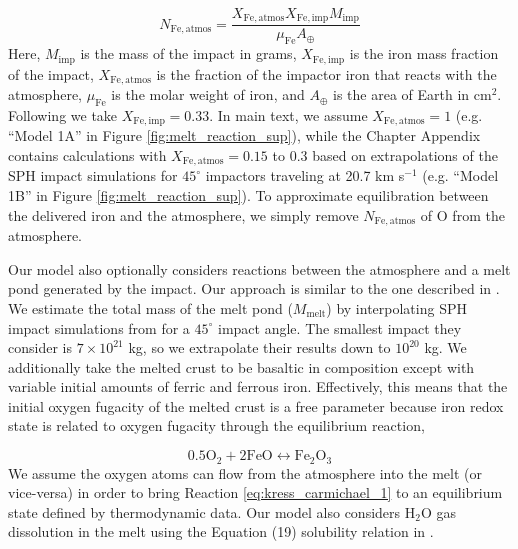 \begin{equation}
  N_\mathrm{Fe,atmos} = \frac{X_\mathrm{Fe,atmos} X_\mathrm{Fe,imp} M_\mathrm{imp}}{\mu_\mathrm{Fe} A_\oplus}
\end{equation}
Here, $M_\mathrm{imp}$ is the mass of the impact in grams, $X_\mathrm{Fe,imp}$ is the iron mass fraction of the impact, $X_\mathrm{Fe,atmos}$ is the fraction of the impactor iron that reacts with the atmosphere, $\mu_\mathrm{Fe}$ is the molar weight of iron, and $A_\oplus$ is the area of Earth in cm$^2$. Following \citet{Zahnle_2020} we take $X_\mathrm{Fe,imp} = 0.33$. In main text, we assume $X_\mathrm{Fe,atmos} = 1$ (e.g. ``Model 1A'' in Figure \ref{fig:melt_reaction_sup}), while the Chapter Appendix contains calculations with $X_\mathrm{Fe,atmos} = 0.15$ to $0.3$ based on extrapolations of the \citet{Citron_2022} SPH impact simulations for $45^{\circ}$ impactors traveling at 20.7 km s$^{-1}$ (e.g. ``Model 1B'' in Figure \ref{fig:melt_reaction_sup}). To approximate equilibration between the delivered iron and the atmosphere, we simply remove $N_\mathrm{Fe,atmos}$ of O from the atmosphere.

Our model also optionally considers reactions between the atmosphere and a melt pond generated by the impact. Our approach is similar to the one described in \citet{Itcovitz_2022}. We estimate the total mass of the melt pond ($M_\mathrm{melt}$) by interpolating SPH impact simulations from \citet{Citron_2022} for a $45^{\circ}$ impact angle. The smallest impact they consider is $7 \times 10^{21}$ kg, so we extrapolate their results down to $10^{20}$ kg. We additionally take the melted crust to be basaltic in composition except with variable initial amounts of ferric and ferrous iron. Effectively, this means that the initial oxygen fugacity of the melted crust is a free parameter because iron redox state is related to oxygen fugacity through the equilibrium reaction,

\begin{equation} 
  \label{eq:kress_carmichael_1}
  0.5 \mathrm{O_2} + 2 \mathrm{FeO} \leftrightarrow \mathrm{Fe_2O_3}
\end{equation}
We assume the oxygen atoms can flow from the atmosphere into the melt (or vice-versa) in order to bring Reaction \ref{eq:kress_carmichael_1} to an equilibrium state defined by \citet{Kress_1991} thermodynamic data. Our model also considers H$_2$O gas dissolution in the melt using the Equation (19) solubility relation in \citet{Itcovitz_2022}.

